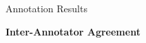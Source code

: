 \documentclass[final,t]{beamer}
\begin{document}
\begin{frame}{}
\begin{columns}[t]
\begin{column}{.33\linewidth}
\begin{block}{Annotation Results}
\begin{center}
\begin{minipage}{.85\textwidth}

\vspace{1em}

\begin{center}
  \bf Inter-Annotator Agreement
\end{center}


\end{minipage}
\end{center}
\end{block}
\end{column}
\end{columns}
\end{frame}
\end{document}
